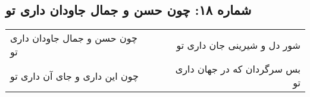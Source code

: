 \begin{center}
\section*{شماره ۱۸: چون حسن و جمال جاودان داری تو}
\label{sec:018}
\begin{longtable}{l p{0.5cm} r}
چون حسن و جمال جاودان داری تو
&&
شور دل و شیرینی جان داری تو
\\
چون این داری و جای آن داری تو
&&
بس سرگردان که در جهان داری تو
\\
\end{longtable}
\end{center}
